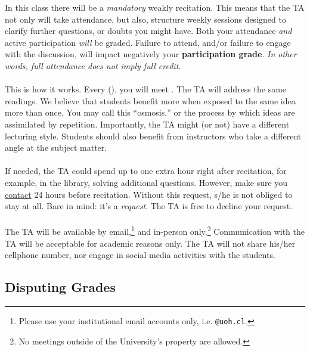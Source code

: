 \documentclass[letterpaper]{article}
\begin{document}
In this class there will be a \emph{mandatory} weakly recitation. This means that the TA not only will take attendance, but also, structure weekly sessions designed  to clarify further questions, or doubts you might have. Both your attendance \emph{and} active participation \emph{will} be graded. Failure to attend, and/or failure to engage with the discussion, will impact negatively your {\bf participation grade}. \emph{In other words, full attendance does not imply full credit}. %
\\
\\
This is how it works. Every {\unskip} ({\unskip}), you will meet {\unskip}. The TA will address the same readings. We believe that students benefit more when exposed to the same idea more than once. You may call this ``osmosis,'' or the process by which ideas are assimilated by repetition. Importantly, the TA might (or not) have a different lecturing style. Students should also benefit from instructors who take a different angle at the subject matter. 
\\
\\
If needed, the TA could spend up to one extra hour right after recitation, for example, in the library, solving additional questions. However, make sure you \href{mailto:ghbarria@uc.cl}{contact} {\unskip} 24 hours before recitation. Without this request, s/he is not obliged to stay at all. Bare in mind: it's a \emph{request}. The TA is free to decline your request.
\\
\\
The TA will be available by email,\footnote{Please use your institutional email accounts only, i.e. \texttt{@uoh.cl}.} and in-person only.\footnote{No meetings outside of the University's property are allowed.} Communication with the TA will be acceptable for academic reasons only. The TA will not share his/her cellphone number, nor engage in social media activities with the students.

\subsection*{Disputing Grades}
\end{document}
